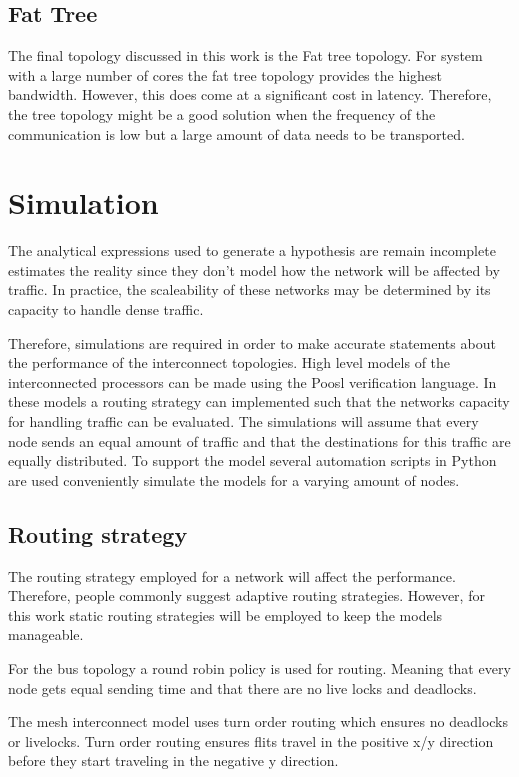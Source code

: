 \documentclass[journal,10pt,twoside, a4paper]{IEEEtran}
\begin{document}
\subsection{Fat Tree}
The final topology discussed in this work is the Fat tree topology. For system with a large number of cores the fat tree topology provides the highest bandwidth. However, this does come at a significant cost in latency. Therefore, the tree topology might be a good solution when the frequency of the communication is low but a large amount of data needs to be transported.

\section{Simulation}

The analytical expressions used to generate a hypothesis are remain incomplete estimates the reality since they don't model how the network will  be affected by traffic. In practice, the scaleability of these networks may be determined by its capacity to handle dense traffic.    

Therefore, simulations are required in order to make accurate statements about the performance of the interconnect topologies. High level models of the interconnected processors can be made using the Poosl verification language. In these models a routing strategy can implemented such that the networks capacity for handling traffic can be evaluated. The simulations will assume that every node sends an equal amount of traffic and that the destinations for this traffic are equally distributed. To support the model several automation scripts in Python are used conveniently simulate the models for a varying amount of nodes. 

\subsection{Routing strategy}

The routing strategy employed for a network will affect the performance. Therefore, people commonly suggest adaptive routing strategies. However, for this work static routing strategies will be employed to keep the models manageable.

For the bus topology a round robin policy is used for routing. Meaning that every node gets equal sending time and that there are no live locks and deadlocks. 

The mesh interconnect model uses turn order routing which ensures no deadlocks or livelocks. Turn order routing ensures flits travel in the positive x/y direction before they start traveling in the negative y direction. 
\end{document}
